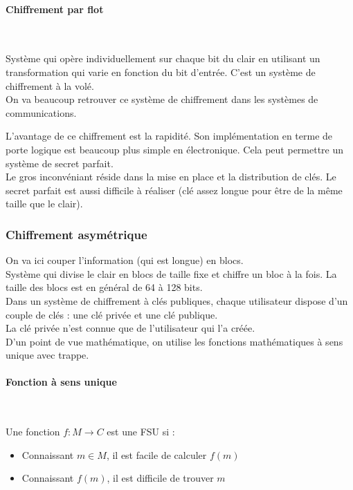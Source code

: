 \paragraph{Chiffrement par flot}~\\\par
Système qui opère individuellement sur chaque bit du clair en utilisant un transformation qui varie en fonction du bit d'entrée. C'est un système de chiffrement à la volé.\\
On va beaucoup retrouver ce système de chiffrement dans les systèmes de communications.\\\par
L'avantage de ce chiffrement est la rapidité. Son implémentation en terme de porte logique est beaucoup plus simple en électronique. Cela peut permettre un système de secret parfait.\\
Le gros inconvéniant réside dans la mise en place et la distribution de clés. Le secret parfait est aussi difficile à réaliser (clé assez longue pour être de la même taille que le clair).
\subsubsection{Chiffrement asymétrique}
On va ici couper l'information (qui est longue) en blocs.\\
Système qui divise le clair en blocs de taille fixe et chiffre un bloc à la fois. La taille des blocs est en général de 64 à 128 bits.\\
Dans un système de chiffrement à clés publiques, chaque utilisateur dispose d'un couple de clés : une clé privée et une clé publique.\\
La clé privée n'est connue que de l'utilisateur qui l'a créée.\\
D'un point de vue mathématique, on utilise les fonctions mathématiques à sens unique avec trappe.
\paragraph{Fonction à sens unique}~\\\par
Une fonction $f:M\rightarrow C$ est une FSU si :
\begin{itemize}
 \item Connaissant $m\in M$, il est facile de calculer $f(m)$
 \item Connaissant $f(m)$, il est difficile de trouver $m$
\end{itemize}
